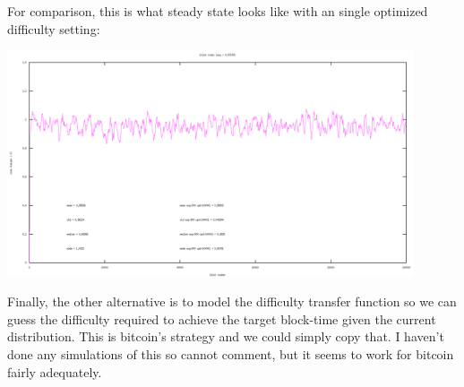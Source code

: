 \documentclass[10pt,a4paper]{article}
\begin{document}
	For comparison, this is what steady state looks like with an single optimized difficulty setting:
\begin{center}
\includegraphics[width=12cm]{SimulationGraphs/simulation_avg-500_upd-none.png}
\end{center}

	Finally, the other alternative is to model the difficulty transfer function so we can guess the difficulty required to achieve the target block-time given the current distribution. This is bitcoin's strategy and we could simply copy that. I haven't done any simulations of this so cannot comment, but it seems to work for bitcoin fairly adequately. 
\end{document}
